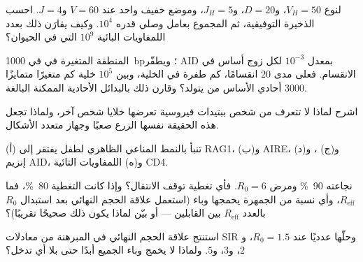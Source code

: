 \begin{exercise}[$\star\star$]\label{exo:b3:adaptive-immunity:5}
لنوع $V_{H} = 50$، و$D = 20$، و$J_{H} = 5$، وموضع خفيف واحد
عند $V = 60$ و$J = 4$. احسب الذخيرة التوفيقية، ثم المجموع
بعامل وصلي قدره $10^{4}$. وكيف يقارَن ذلك بعدد اللمفاويات
البائية $10^{9}$ التي في الحيوان؟
\end{exercise}

\begin{exercise}[$\star\star$]\label{exo:b3:adaptive-immunity:6}
المنطقة المتغيرة في  في  \qty{1000}{bp}؛
ويطفّر AID بمعدل $10^{-3}$ لكل زوج أساس في الانقسام. فعلى مدى
$20$ انقسامًا، كم طفرة في الخلية، وبين $10^{5}$ خلية كم
متغيرًا متمايزًا أحادي الأساس من  يتولد؟ وقارن ذلك
بالبدائل الأحادية الممكنة البالغة $3000$.
\end{exercise}

\begin{exercise}[$\star\star$]\label{exo:b3:adaptive-immunity:7}
اشرح لماذا لا تتعرف  من شخص ببتيدات فيروسية
تعرضها خلايا شخص آخر، ولماذا تجعل هذه الحقيقة نفسها الزرع
صعبًا وجهاز  متعدد الأشكال.
\end{exercise}

\begin{exercise}[$\star\star$]\label{exo:b3:adaptive-immunity:8}
تنبأ بالنمط المناعي الظاهري لطفل يفتقر إلى (أ) RAG1، و(ب)
AIRE، و(ج) ، و(د) إنزيم  AID، و(ه) اللمفاويات التائية CD4.
\end{exercise}

\begin{exercise}[$\star\star$]\label{exo:b3:adaptive-immunity:9}
 نجاعته \qty{90}{\%} ومرض $R_{0} = 6$. فأي تغطية توقف
الانتقال؟ وإذا كانت التغطية \qty{80}{\%}، فما
$R_{\text{eff}}$، وأي نسبة من الجمهرة يخمجها وباء (استعمل
علاقة الحجم النهائي بعد استبدال $R_{0}$ بالعدد
$R_{\text{eff}}$ بين القابلين --- أو بيّن لماذا يكون ذلك صحيحًا تقريبًا)؟
\end{exercise}

\begin{exercise}[$\star\star\star$]\label{exo:b3:adaptive-immunity:10}
استنتج علاقة الحجم النهائي في المبرهنة من معادلات SIR
وحلّها عدديًا عند $R_{0} = 1.5$، و$2$، و$3$، و$5$. ولماذا لا
يخمج وباء الجميع أبدًا حتى بلا أي تدخل؟
\end{exercise}

